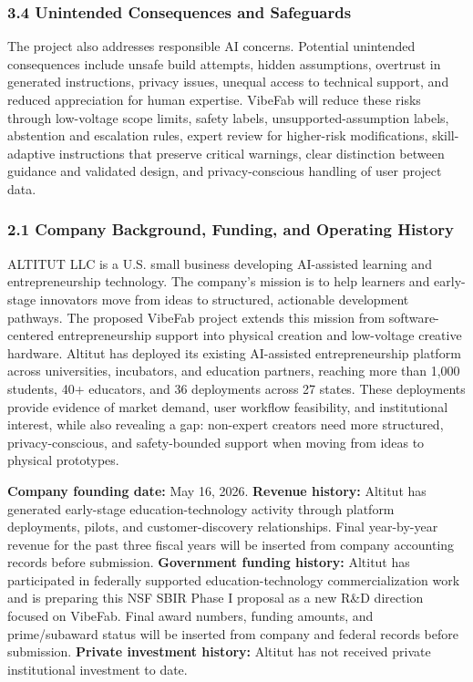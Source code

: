 \subsubsection*{3.4 Unintended Consequences and Safeguards}

The project also addresses responsible AI concerns. Potential unintended consequences include unsafe build attempts, hidden assumptions, overtrust in generated instructions, privacy issues, unequal access to technical support, and reduced appreciation for human expertise. VibeFab will reduce these risks through low-voltage scope limits, safety labels, unsupported-assumption labels, abstention and escalation rules, expert review for higher-risk modifications, skill-adaptive instructions that preserve critical warnings, clear distinction between guidance and validated design, and privacy-conscious handling of user project data.




\subsubsection*{2.1 Company Background, Funding, and Operating History}

ALTITUT LLC is a U.S. small business developing AI-assisted learning and entrepreneurship technology. The company's mission is to help learners and early-stage innovators move from ideas to structured, actionable development pathways. The proposed VibeFab project extends this mission from software-centered entrepreneurship support into physical creation and low-voltage creative hardware. Altitut has deployed its existing AI-assisted entrepreneurship platform across universities, incubators, and education partners, reaching more than 1,000 students, 40+ educators, and 36 deployments across 27 states. These deployments provide evidence of market demand, user workflow feasibility, and institutional interest, while also revealing a gap: non-expert creators need more structured, privacy-conscious, and safety-bounded support when moving from ideas to physical prototypes.

\textbf{Company founding date:} May 16, 2026.  
\textbf{Revenue history:} Altitut has generated early-stage education-technology activity through platform deployments, pilots, and customer-discovery relationships. Final year-by-year revenue for the past three fiscal years will be inserted from company accounting records before submission.  
\textbf{Government funding history:} Altitut has participated in federally supported education-technology commercialization work and is preparing this NSF SBIR Phase I proposal as a new R\&D direction focused on VibeFab. Final award numbers, funding amounts, and prime/subaward status will be inserted from company and federal records before submission.  
\textbf{Private investment history:} Altitut has not received private institutional investment to date.

